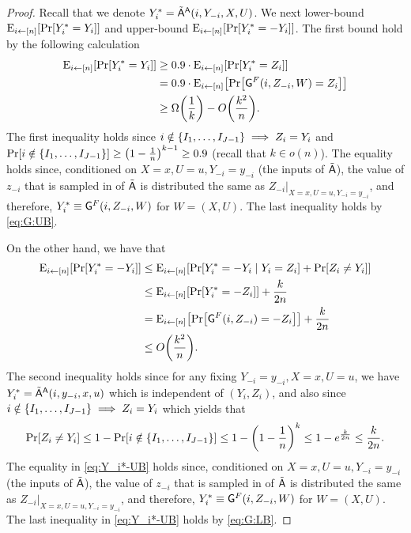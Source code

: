 \begin{proof}
	Recall that we denote $Y_i^* = {\tilde{\mathsf{A}}}^{\mathsf{A}}(i,Y_{-i},X,U)$. We next lower-bound $\eex{i \la [n]}{\pr{Y_i^* = Y_i}}$ and upper-bound $\eex{i \la [n]}{\pr{Y_i^* = -Y_i}}$.
	The first bound hold by the following calculation
	\begin{align}\label{eq:Y_i*-LB}
		\eex{i \la [n]}{\pr{Y_i^* = Y_i}}
		&\geq 0.9 \cdot \eex{i \la [n]}{\pr{Y_i^* = Z_i}}\\
		&= 0.9 \cdot \eex{i \la [n]}{\pr{\Gc^{F}(i,Z_{-i},W) = Z_i}}\nonumber\\
		&\geq \Omega\paren{\frac1k} - O\paren{\frac{k^2}{n}}.\nonumber
	\end{align}
	The first inequality holds since $i \notin \set{I_1,\ldots,I_{J-1}} \implies Z_i = Y_i$ and $\pr{i \notin \set{I_1,\ldots,I_{J-1}}} \geq \paren{1 - \frac1n}^{k-1} \geq 0.9$ (recall that $k \in o(n)$). The equality holds since, conditioned on $X=x,U=u,Y_{-i} = y_{-i}$ (the inputs of ${\tilde{\mathsf{A}}}$), the value of $z_{-i}$ that is sampled in  of ${\tilde{\mathsf{A}}}$ is distributed the same as $Z_{-i}|_{X=x,U=u,Y_{-i} = y_{-i}}$, and therefore, $Y_i^* \equiv \mathsf{G}^{F}(i,Z_{-i},W)$ for $W = (X,U)$. The last inequality holds by \cref{eq:G:UB}.
	
	On the other hand, we have that
	\begin{align}\label{eq:Y_i*-UB}
		\eex{i \la [n]}{\pr{Y_i^* = -Y_i}}
		&\leq \eex{i \la [n]}{\pr{Y_i^* = - Y_i \mid Y_i = Z_i} + \pr{Z_i \neq Y_i}}\\
		&\leq \eex{i \la [n]}{\pr{Y_i^* = - Z_i}} + \frac{k}{2n}\nonumber\\
		&=  \eex{i \la [n]}{\pr{\Gc^{F}(i,Z_{-i}) = - Z_i}} + \frac{k}{2n}\nonumber\\
		&\leq O\paren{\frac{k^2}{n}}.\nonumber
	\end{align}
	The second inequality holds since for any fixing $Y_{-i}=y_{-i},X=x,U=u$, we have $Y_i^*= {\tilde{\mathsf{A}}}^{\mathsf{A}}(i,y_{-i},x,u)$ which is independent of $(Y_i,Z_i)$, and also since $i \notin \set{I_1,\ldots,I_{J-1}} \implies Z_i = Y_i$ which yields that
	\begin{align*}
		\pr{Z_i \neq Y_i} \leq 1 - \pr{i \notin \set{I_1,\ldots,I_{J-1}}} \leq 1 - \paren{1 - \frac1n}^{k} \leq 1 - e^{\frac{k}{2n}} \leq \frac{k}{2n}. 
	\end{align*}
	The equality in \cref{eq:Y_i*-UB} holds since, conditioned on $X=x,U=u,Y_{-i} = y_{-i}$ (the inputs of ${\tilde{\mathsf{A}}}$), the value of $z_{-i}$ that is sampled in  of ${\tilde{\mathsf{A}}}$ is distributed the same as $Z_{-i}|_{X=x,U=u,Y_{-i} = y_{-i}}$, and therefore, $Y_i^* \equiv \mathsf{G}^{F}(i,Z_{-i},W)$ for $W = (X,U)$. The last inequality in \cref{eq:Y_i*-UB} holds by \cref{eq:G:LB}.
	

\end{proof}
